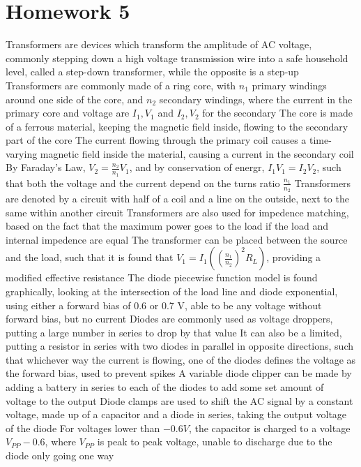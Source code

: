 \documentclass[11 pt, twoside]{article}
\newenvironment{outline*}
{
	\begin{outline}[enumerate]
	}
	{\end{outline}
}
\begin{document}
\section{Homework 5}
\begin{outline*}
\1 Transformers are devices which transform the amplitude of AC voltage, commonly stepping down a high voltage transmission wire into a safe household level, called a step-down transformer, while the opposite is a step-up
	\2 Transformers are commonly made of a ring core, with $n_1$ primary windings around one side of the core, and $n_2$ secondary windings, where the current in the primary core and voltage are $I_1, V_1$ and $I_2, V_2$ for the secondary
		\3 The core is made of a ferrous material, keeping the magnetic field inside, flowing to the secondary part of the core
		\3 The current flowing through the primary coil causes a time-varying magnetic field inside the material, causing a current in the secondary coil
	\2 By Faraday's Law, $V_2 = \frac{n_2}{n_1}V_1$, and by conservation of energr, $I_1V_1 = I_2V_2$, such that both the voltage and the current depend on the turns ratio $\frac{n_1}{n_2}$
	\2 Transformers are denoted by a circuit with half of a coil and a line on the outside, next to the same within another circuit
	\2 Transformers are also used for impedence matching, based on the fact that the maximum power goes to the load if the load and internal impedence are equal
		\3 The transformer can be placed between the source and the load, such that it is found that $V_1 = I_1((\frac{n_1}{n_2})^2R_L)$, providing a modified effective resistance
\1 The diode piecewise function model is found graphically, looking at the intersection of the load line and diode exponential, using either a forward bias of 0.6 or 0.7 V, able to be any voltage without forward bias, but no current
\1 Diodes are commonly used as voltage droppers, putting a large number in series to drop by that value
	\2 It can also be a limited, putting a resistor in series with two diodes in parallel in opposite directions, such that whichever way the current is flowing, one of the diodes defines the voltage as the forward bias, used to prevent spikes
		\3 A variable diode clipper can be made by adding a battery in series to each of the diodes to add some set amount of voltage to the output
	\2 Diode clamps are used to shift the AC signal by a constant voltage, made up of a capacitor and a diode in series, taking the output voltage of the diode
		\3 For voltages lower than $-0.6 V$, the capacitor is charged to a voltage $V_{PP} - 0.6$, where $V_{PP}$ is peak to peak voltage, unable to discharge due to the diode only going one way

\end{outline*}
\end{document}
